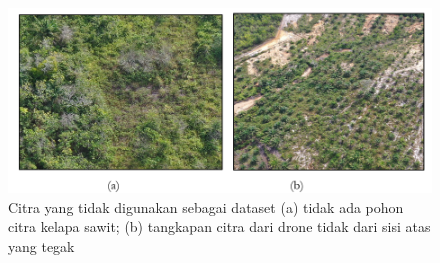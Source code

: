 \begin{figure}[H]
	\vspace{-0.1cm}
	\begin{center}
		\includegraphics[width=1\columnwidth]{bab3/Gambar/Picture10.png}
	\end{center}
	\vspace{-0.2cm}
	\captionsetup{justification=centering}
	\caption{Citra yang tidak digunakan sebagai dataset (a) tidak ada pohon citra kelapa sawit; (b) tangkapan citra dari drone tidak dari sisi atas yang tegak}\label{img:Citra-Yang-Tidak-Digunakan}
\end{figure}

